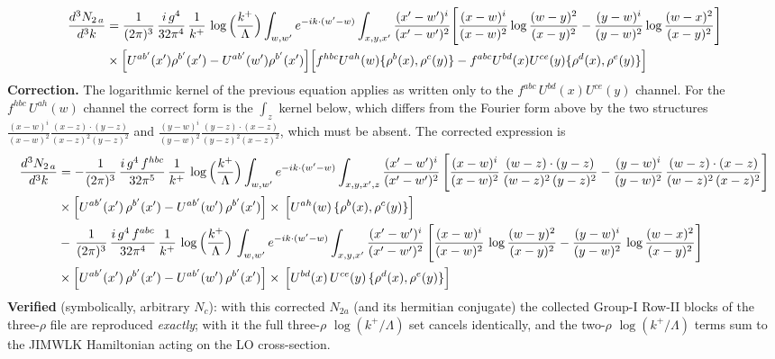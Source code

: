 \documentclass[9pt]{article}
\numberwithin{equation}{section}
\begin{document}
\begin{align}
\frac{d^{3}N_{2\,a}}{d^{3}k} & = \frac{1}{(2\pi)^{3}}\,\frac{i\,g^{4}}{32\pi^{4}}\,\frac{1}{k^{+}}\,\log\Big(\frac{k^{+}}{\Lambda}\Big)\int_{w,w'} e^{-ik\cdot(w'-w)}\int_{x,y,x'}\frac{(x'-w')^{i}}{(x'-w')^{2}}\Bigg[\frac{(x-w)^{i}}{(x-w)^{2}}\log\frac{(w-y)^{2}}{(x-y)^{2}}-\frac{(y-w)^{i}}{(y-w)^{2}}\log\frac{(w-x)^{2}}{(x-y)^{2}}\Bigg]\notag\\
&\times\Big[U^{ab'}(x')\rho^{b'}(x')-U^{ab'}(w')\rho^{b'}(x')\Big]\Big[f^{hbc}U^{ah}(w)\{\rho^{b}(x),\rho^{c}(y)\}-f^{abc}U^{bd}(x)U^{ce}(y)\{\rho^{d}(x),\rho^{e}(y)\}\Big]
\end{align}
{\color{red}\noindent\textbf{Correction.} The logarithmic kernel of the previous equation applies as written only to the $f^{abc}\,U^{bd}(x)U^{ce}(y)$ channel. For the $f^{hbc}\,U^{ah}(w)$ channel the correct form is the $\int_{z}$ kernel below, which differs from the Fourier form above by the two structures $\frac{(x-w)^{i}}{(x-w)^{2}}\frac{(x-z)\cdot(y-z)}{(x-z)^{2}(y-z)^{2}}$ and $\frac{(y-w)^{i}}{(y-w)^{2}}\frac{(y-z)\cdot(x-z)}{(y-z)^{2}(x-z)^{2}}$, which must be absent. The corrected expression is
\begin{align}
\frac{d^{3}N_{2\,a}}{d^{3}k} & = -\frac{1}{(2\pi)^{3}}\,\frac{i\,g^{4}\,f^{hbc}}{32\pi^{5}}\,\frac{1}{k^{+}}\,\log\Big(\frac{k^{+}}{\Lambda}\Big)
\int_{w,w'} e^{-ik\cdot(w'-w)}\int_{x,y,x',z}\frac{(x'-w')^{i}}{(x'-w')^{2}}\,\Bigg[\frac{(x-w)^{i}}{(x-w)^{2}}\, \frac{(w-z)\cdot (y-z)}{(w-z)^{2}\,(y-z)^{2}} - \frac{(y-w)^{i}}{(y-w)^{2}}\, \frac{(w-z)\cdot (x-z)}{(w-z)^{2}\,(x-z)^{2}}\Bigg]\notag \\ & \times\Big[U^{ab'}(x')\,\rho^{b'}(x')-U^{ab'}(w')\,\rho^{b'}(x')\Big]\times\, \Big[U^{ah}(w)\,\{\rho^{b}(x),\rho^{c}(y)\}\Big]\notag \\ &  -\,\frac{1}{(2\pi)^{3}}\,\frac{i\,g^{4}\,f^{abc}}{32\pi^{4}}\,\frac{1}{k^{+}}\,\log\Big(\frac{k^{+}}{\Lambda}\Big)\,
\int_{w,w'} e^{-ik\cdot(w'-w)}\int_{x,y,x'}\frac{(x'-w')^{i}}{(x'-w')^{2}}\,\Bigg[\frac{(x-w)^{i}}{(x-w)^{2}}\,\log\frac{(w-y)^{2}}{(x-y)^{2}} -\frac{(y-w)^{i}}{(y-w)^{2}}\,\log\frac{(w-x)^{2}}{(x-y)^{2}}\Bigg]\notag \\ & \times \Big[U^{ab'}(x')\,\rho^{b'}(x')-U^{ab'}(w')\,\rho^{b'}(x')\Big]\times\, \Big[U^{bd}(x)\,U^{ce}(y)\,\{\rho^{d}(x),\rho^{e}(y)\}\Big]
\end{align}
\noindent\textbf{Verified} (symbolically, arbitrary $N_{c}$): with this corrected $N_{2a}$ (and its hermitian conjugate) the collected Group-I Row-II blocks of the three-$\rho$ file are reproduced \emph{exactly}; with it the full three-$\rho$ $\log(k^{+}/\Lambda)$ set cancels identically, and the two-$\rho$ $\log(k^{+}/\Lambda)$ terms sum to the JIMWLK Hamiltonian acting on the LO cross-section.}
\end{document}

